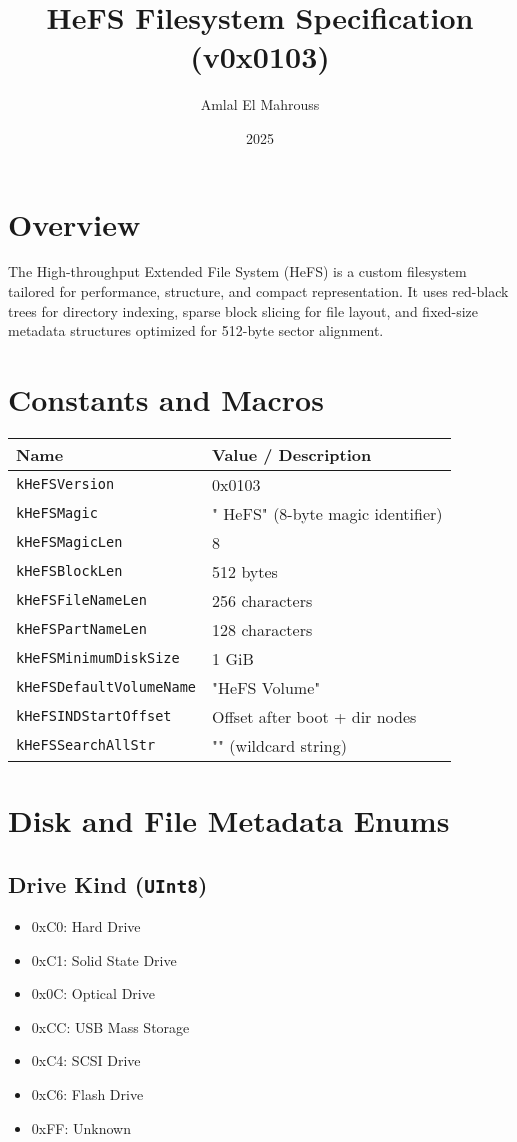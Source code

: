 \documentclass{article}
\title{HeFS Filesystem Specification (v0x0103)}
\author{Amlal El Mahrouss}
\date{2025}
\begin{document}
\maketitle

\section{Overview}
The High-throughput Extended File System (HeFS) is a custom filesystem tailored for performance, structure, and compact representation. It uses red-black trees for directory indexing, sparse block slicing for file layout, and fixed-size metadata structures optimized for 512-byte sector alignment.

\section{Constants and Macros}
\begin{longtable}{|l|l|}
\hline
\textbf{Name} & \textbf{Value / Description} \\
\hline
\texttt{kHeFSVersion} & 0x0103 \\
\texttt{kHeFSMagic} & "  HeFS" (8-byte magic identifier) \\
\texttt{kHeFSMagicLen} & 8 \\
\texttt{kHeFSBlockLen} & 512 bytes \\
\texttt{kHeFSFileNameLen} & 256 characters \\
\texttt{kHeFSPartNameLen} & 128 characters \\
\texttt{kHeFSMinimumDiskSize} & 1 GiB \\
\texttt{kHeFSDefaultVolumeName} & "HeFS Volume" \\
\texttt{kHeFSINDStartOffset} & Offset after boot + dir nodes \\
\texttt{kHeFSSearchAllStr} & "\*" (wildcard string) \\
\hline
\end{longtable}

\section{Disk and File Metadata Enums}

\subsection{Drive Kind (\texttt{UInt8})}
\begin{itemize}
\item 0xC0: Hard Drive
\item 0xC1: Solid State Drive
\item 0x0C: Optical Drive
\item 0xCC: USB Mass Storage
\item 0xC4: SCSI Drive
\item 0xC6: Flash Drive
\item 0xFF: Unknown
\end{itemize}
\end{document}
